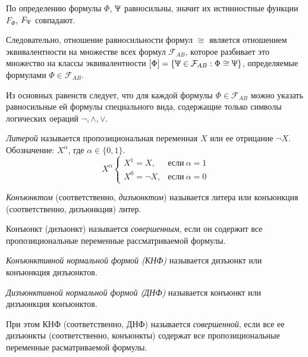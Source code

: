 По определению формулы $\Phi$, $\Uppsi$ равносильны, значит их истинностные функции $F_\Phi$, $F_\Uppsi$ совпадают. 

Следовательно, отношение равносильности формул $\cong$ является отношением эквивалентности на множестве всех формул $\mathcal{F} _{AB}$, которое разбивает это множество на классы эквивалентности $[\Phi] = \{\Uppsi \in \mathcal{F} _{AB}: \Phi \cong \Uppsi\}$, определяемые формулами $\Phi\in\mathcal{F} _{AB} $.

Из основных равенств следует, что для каждой формулы $\Phi \in \mathcal{F} _{AB}$ можно указать равносильные ей формулы специального вида, содержащие только символы логических оераций $\lnot, \land, \lor$.

\begin{definition}
    \textit{Литерой} называется пропозициональная переменная $X$ или ее отрицание $\lnot X$. Обозначение: $X^\alpha$, где $\alpha\in\{0,1\}$.
    \begin{equation}
        X^\alpha
        \begin{cases}
            X^1 = X, & \text{если}~ \alpha = 1 \\
            X^0 = \lnot X, & \text{если}~ \alpha = 0
        \end{cases}
    \end{equation}
\end{definition}

\begin{definition}
    \textit{Конъюнктом} (соответственно, \textit{дизъюнктом}) называется литера или конъюнкция (соответственно, дизъюнкция) литер.

    Конъюнкт (дизъюнкт) называется \textit{совершенным}, если он содержит все пропозициональные переменные рассматриваемой формулы.
\end{definition}

\begin{definition}
    \textit{Конъюнктивной нормальной формой (КНФ)} называется дизъюнкт или конъюнкция дизъюнктов.

    \textit{Дизъюнктивной нормальной формой (ДНФ)} называется конъюнкт или дизъюнкция конъюнктов. 

    При этом КНФ (соответственно, ДНФ) называется \textit{совершенной}, если все ее дизъюнкты (соответственно, конъюнкты) содержат все пропозициональные переменные расматриваемой формулы.
\end{definition}

